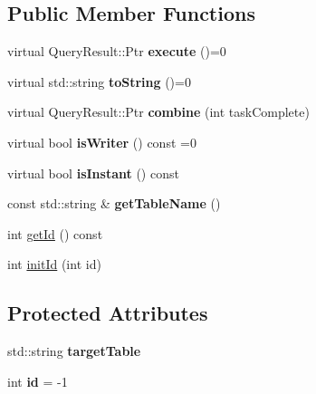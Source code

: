 \subsection*{Public Member Functions}
\begin{DoxyCompactItemize}
\item 
\mbox{\label{class_query_a758043f481c17af17a48e120ff9ea741}} 
virtual Query\+Result\+::\+Ptr {\bfseries execute} ()=0
\item 
\mbox{\label{class_query_afaa6bbe4624620f71e71e259d3f22e31}} 
virtual std\+::string {\bfseries to\+String} ()=0
\item 
\mbox{\label{class_query_af9372fbd5d47c9ab56f37a003a9d7953}} 
virtual Query\+Result\+::\+Ptr {\bfseries combine} (int task\+Complete)
\item 
\mbox{\label{class_query_acf7e3add22f3f1317984787fd2e0a251}} 
virtual bool {\bfseries is\+Writer} () const =0
\item 
\mbox{\label{class_query_aadb2c7d662d4d2a0ee7b5538c4bf90c4}} 
virtual bool {\bfseries is\+Instant} () const
\item 
\mbox{\label{class_query_a1627ac6e59d31bc9b5b0e1a58315e8b7}} 
const std\+::string \& {\bfseries get\+Table\+Name} ()
\item 
int \hyperlink{class_query_af59c2164a6ccfe1ad6cc0c6b8ae33938}{get\+Id} () const
\item 
int \hyperlink{class_query_a162c2530d5a3dc048759ec12788b5c90}{init\+Id} (int id)
\end{DoxyCompactItemize}
\subsection*{Protected Attributes}
\begin{DoxyCompactItemize}
\item 
\mbox{\label{class_query_ae4aa2f36a804413761d4e131ea407a0b}} 
std\+::string {\bfseries target\+Table}
\item 
\mbox{\label{class_query_a3f961ca1a9c82eda79aef080b00a91ef}} 
int {\bfseries id} = -\/1
\end{DoxyCompactItemize}


